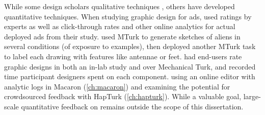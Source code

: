 While some design scholars  qualitative techniques \cite{Schon1982,Cross2007,Cross2011}, others have developed quantitative techniques.
When studying graphic design for ads, \citet{Dow2011} used ratings by experts as well as click-through rates and other online analytics for actual deployed ads from their study.
\citet{Kulkarni2014} used MTurk to generate sketches of aliens in several conditions (of exposure to examples), then deployed another MTurk task to label each drawing with features like antennae or feet.
\citet{Lee2010a} had end-users rate graphic designs in both an in-lab study and over Mechanical Turk, and recorded time participant designers spent on each component.
 using an online editor with analytic logs in Macaron (\autoref{ch:macaron}) and examining the potential for crowdsourced feedback with HapTurk (\autoref{ch:hapturk}).
While a valuable goal, large-scale quantitative feedback on \haxd remains outside the scope of this dissertation.

